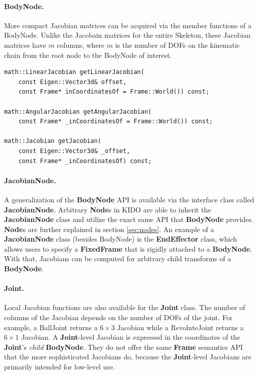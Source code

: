 

\paragraph{BodyNode.} More compact Jacobian matrices can be acquired
via the member functions of a BodyNode. Unlike the Jacobain matrices
for the entire Skeleton, these Jacobian matrices have $m$ columns, where $m$ is the number of DOFs on the kinematic chain from the root node to the BodyNode of interest.


\begin{lstlisting}[caption=BodyNode.h]
math::LinearJacobian getLinearJacobian(
    const Eigen::Vector3d& offset, 
    const Frame* inCoordinatesOf = Frame::World()) const;

math::AngularJacobian getAngularJacobian(
    const Frame* _inCoordinatesOf = Frame::World()) const;

math::Jacobian getJacobian(
    const Eigen::Vector3d& _offset, 
    const Frame* _inCoordinatesOf) const;
\end{lstlisting}

\paragraph{JacobianNode.} A generalization of the \textbf{BodyNode} API is available via the interface class called \textbf{JacobianNode}. Arbitrary \textbf{Node}s in KIDO are able to inherit the \textbf{JacobianNode} class and utilize the exact same API that \textbf{BodyNode} provides. \textbf{Node}s are further explained in section \ref{sec:nodes}. An example of a \textbf{JacobianNode} class (besides BodyNode) is the \textbf{EndEffector} class, which allows users to specify a \textbf{FixedFrame} that is rigidly attached to a \textbf{BodyNode}. With that, Jacobians can be computed for arbitrary child transforms of a \textbf{BodyNode}.

\paragraph{Joint.} Local Jacobian functions are also available for
the \textbf{Joint} class. The number of columns of the Jacobian depends on the
number of DOFs of the joint. For example, a BallJoint returns a $6
\times 3$ Jacobian while a RevoluteJoint returns a $6 \times 1$ Jacobian. A \textbf{Joint}-level Jacobian is expressed in the coordinates of the \textbf{Joint}'s \textit{child} \textbf{BodyNode}. They do not offer the same \textbf{Frame} semantics API that the more sophisticated Jacobians do, because the \textbf{Joint}-level Jacobians are primarily intended for low-level use.

